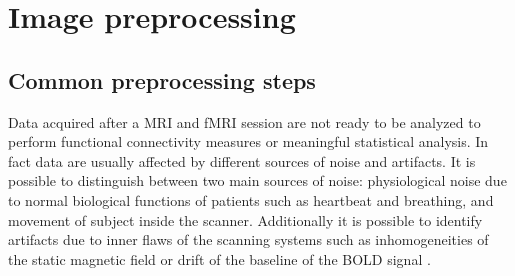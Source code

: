 \documentclass[11pt]{report}
\begin{document}
\chapter{Image preprocessing}\label{chap:image_preprocessing}
\section{Common preprocessing steps}
\label{sec:preprocessing_steps}

Data acquired after a MRI and fMRI session are not ready to be analyzed to perform functional connectivity measures or meaningful statistical analysis.
In fact data are usually affected by different sources of noise and artifacts.
It is possible to distinguish between two main sources of noise: physiological noise due to normal biological functions of patients such as heartbeat and breathing, and movement of subject inside the scanner.
Additionally it is possible to identify artifacts due to inner flaws of the scanning systems such as inhomogeneities of the static magnetic field or drift of the baseline of the BOLD signal \cite{bijsterbosch2017}.




\end{document}
